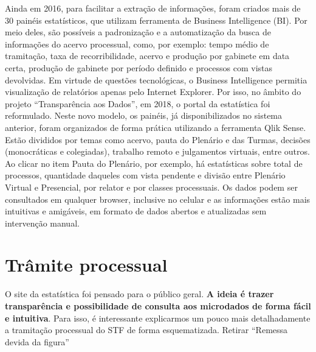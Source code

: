 \documentclass[
]{book}
\begin{document}
Ainda em 2016, para facilitar a extração de informações, foram criados mais de 30 painéis estatísticos, que utilizam ferramenta de Business Intelligence (BI). Por meio deles, são possíveis a padronização e a automatização da busca de informações do acervo processual, como, por exemplo: tempo médio de tramitação, taxa de recorribilidade, acervo e produção por gabinete em data certa, produção de gabinete por período definido e processos com vistas devolvidas.
Em virtude de questões tecnológicas, o Business Intelligence permitia visualização de relatórios apenas pelo Internet Explorer. Por isso, no âmbito do projeto ``Transparência aos Dados'', em 2018, o portal da estatística foi reformulado. Neste novo modelo, os painéis, já disponibilizados no sistema anterior, foram organizados de forma prática utilizando a ferramenta Qlik Sense. Estão divididos por temas como acervo, pauta do Plenário e das Turmas, decisões (monocráticas e colegiadas), trabalho remoto e julgamentos virtuais, entre outros. Ao clicar no item Pauta do Plenário, por exemplo, há estatísticas sobre total de processos, quantidade daqueles com vista pendente e divisão entre Plenário Virtual e Presencial, por relator e por classes processuais. Os dados podem ser consultados em qualquer browser, inclusive no celular e as informações estão mais intuitivas e amigáveis, em formato de dados abertos e atualizadas sem intervenção manual.

\hypertarget{tramite}{%
\chapter{Trâmite processual}\label{tramite}}

O site da estatística foi pensado para o público geral. \textbf{A ideia é trazer transparência e possibilidade de consulta aos microdados de forma fácil e intuitiva}. Para isso, é interessante explicarmos um pouco mais detalhadamente a tramitação processual do STF de forma esquematizada. Retirar ``Remessa devida da figura''
\end{document}
